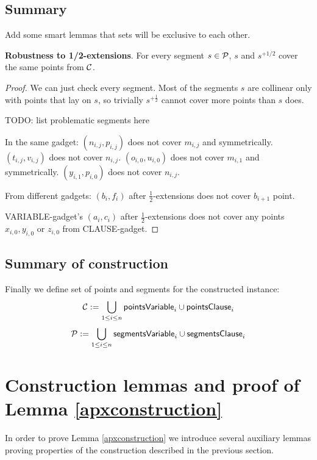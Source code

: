 \subsection{Summary}

Add some smart lemmas that sets will be exclusive to each other.

\begin{lemma}
\textbf{Robustness to 1/2-extensions}. For every segment $s \in \mathcal{P}$,
$s$ and $s^{+1/2}$ cover the same points from $\mathcal{C}$.
\end{lemma}

\begin{proof}
We can just check every segment. Most of the segments $s$
are collinear only with points that lay on $s$,
so trivially $s^{+\frac{1}{2}}$ cannot cover more points than $s$ does.

TODO: list problematic segments here

In the same gadget:
$(n_{i,j}, p_{i,j})$ does not cover $m_{i,j}$ and symmetrically.
$(t_{i,j}, v_{i,j})$ does not cover $n_{i,j}$.
$(o_{i,0}, u_{i,0})$ does not cover $m_{i,1}$ and symmetrically.
$(y_{i,1}, p_{i,0})$ does not cover $n_{i,j}$.



From different gadgets:
$(b_i, f_i)$ after $\frac{1}{2}$-extensions does not
cover $b_{i+1}$ point.

VARIABLE-gadget's $(a_i, c_i)$ after $\frac{1}{2}$-extensions does not
cover any points $x_{i,0}, y_{i,0}$ or $z_{i,0}$ from CLAUSE-gadget.


\end{proof}


\subsection{Summary of construction}


Finally we define set of points and segments for the constructed instance:
$$\mathcal{C} := \bigcup_{1 \le i \le n} \mathsf{pointsVariable}_{i} \cup \mathsf{pointsClause}_i $$
$$\mathcal{P} := \bigcup_{1 \le i \le n} \mathsf{segmentsVariable}_{i} \cup \mathsf{segmentsClause}_i $$

\section{Construction lemmas and proof of Lemma \ref{apxconstruction}}

In order to prove Lemma \ref{apxconstruction} we introduce several
auxiliary lemmas proving properties of the construction
described in the previous section.

